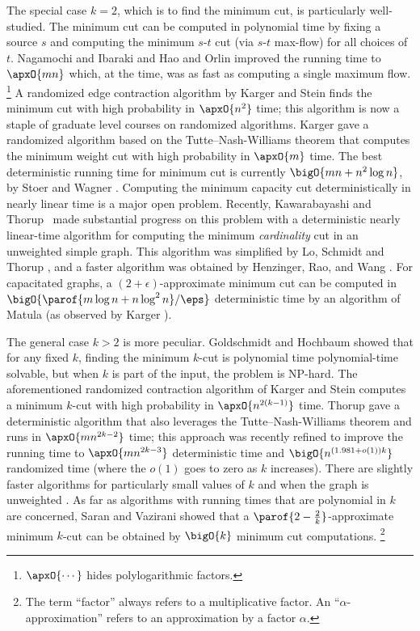 \documentclass{toc}
\begin{document}
The special case $k = 2$, which is to find the minimum cut, is
particularly well-studied. The minimum cut can be computed in
polynomial time by fixing a source $s$ and computing the minimum
$s$-$t$ cut (via $s$-$t$ max-flow) for all choices of $t$. Nagamochi
and
Ibaraki %
\cite{ni-92-sidm,ni-92-algorithmica} %
and Hao and Orlin \cite{ho-94} improved the running time to
$\apxO{m n}$ which, at the time, was as fast as computing a single
maximum flow.%
\footnote{$\apxO{\cdots}$ hides polylogarithmic factors.} %
A randomized edge contraction algorithm by Karger and Stein
\cite{ks-96} finds the minimum cut with high probability in
$\apxO{n^2}$ time; this algorithm is now a staple of graduate level
courses on randomized algorithms. Karger \cite{karger-00} gave a
randomized algorithm based on the Tutte--Nash-Williams theorem
\cite{n-61,t-61} that computes the minimum weight cut with high
probability in $\apxO{m}$ time. The best deterministic running time
for minimum cut is currently $\bigO{m n + n^2 \log n}$, by Stoer and
Wagner \cite{sw-97}.  Computing the minimum capacity cut
deterministically in nearly linear time is a major open problem.
Recently, Kawarabayashi and Thorup~\cite{kt-15} made substantial
progress on this problem with a
deterministic %
nearly linear-time %
algorithm for computing the minimum \emph{cardinality} cut in an
unweighted simple graph. This algorithm was simplified by Lo, Schmidt
and Thorup \cite{lst}, and a faster algorithm was obtained by
Henzinger, Rao, and Wang \cite{hrw-17}. For capacitated graphs, a
$(2+\epsilon)$-approximate minimum cut can be computed in
\begin{math}
  \bigO{\parof{m \log n + n \log^2 n}/{\eps}}
\end{math}
deterministic time by an algorithm of Matula \cite{matula} (as
observed by Karger \cite{karger}).

The general case $k > 2$ is more peculiar. Goldschmidt and Hochbaum
\cite{gh-94} showed that for any fixed $k$, finding the minimum
$k$-cut is polynomial time polynomial-time
solvable, but when $k$ is part of the
input, the problem is %
NP-hard.  %
The aforementioned randomized
contraction algorithm of Karger and Stein \cite{ks-96} computes a
minimum $k$-cut with high probability in
\begin{math}
  \apxO{n^{2(k-1)}}
\end{math}
time. Thorup \cite{thorup-08} gave a deterministic algorithm that also
leverages the Tutte--Nash-Williams theorem \cite{n-61,t-61} and runs
in $\apxO{m n^{2k -2}}$ time; this approach was recently refined to
improve the running time to $\apxO{m n^{2k-3}}$ deterministic time
\cite{cqx} and $\bigO{n^{(1.981 + o(1))k}}$ randomized time
\cite{gll-19} (where the $o(1)$ goes to zero as $k$ increases). There
are slightly faster algorithms for particularly small values of $k$
\cite{levine} and when the graph is unweighted \cite{gll-18-focs}.  As
far as algorithms with running times that are polynomial in $k$ are
concerned, Saran and Vazirani \cite{sv-95} showed that a
$\parof{2 - \frac{2}{k}}$-approximate
minimum %
$k$-cut can be obtained by $\bigO{k}$ minimum cut computations.
%
%
%
%
%
%
%
\footnote{The term ``factor'' always refers to a multiplicative factor.
An ``$\alpha$-approximation'' refers to an approximation
by a factor $\alpha$.}   %
\end{document}

